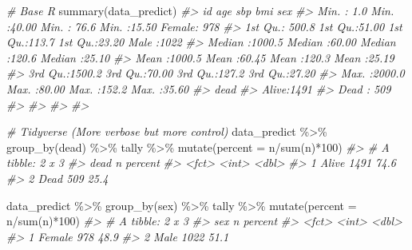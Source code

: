 \documentclass[
]{article}
\newenvironment{Shaded}{\begin{snugshade}}{\end{snugshade}}
\newcommand{\AttributeTok}[1]{\textcolor[rgb]{0.77,0.63,0.00}{#1}}
\newcommand{\CommentTok}[1]{\textcolor[rgb]{0.56,0.35,0.01}{\textit{#1}}}
\newcommand{\DecValTok}[1]{\textcolor[rgb]{0.00,0.00,0.81}{#1}}
\newcommand{\FunctionTok}[1]{\textcolor[rgb]{0.00,0.00,0.00}{#1}}
\newcommand{\NormalTok}[1]{#1}
\newcommand{\SpecialCharTok}[1]{\textcolor[rgb]{0.00,0.00,0.00}{#1}}
\begin{document}
\begin{Shaded}
\begin{Highlighting}[]
\CommentTok{\# Base R}
\FunctionTok{summary}\NormalTok{(data\_predict)}
\CommentTok{\#\textgreater{}        id              age             sbp             bmi            sex      }
\CommentTok{\#\textgreater{}  Min.   :   1.0   Min.   :40.00   Min.   : 76.6   Min.   :15.50   Female: 978  }
\CommentTok{\#\textgreater{}  1st Qu.: 500.8   1st Qu.:51.00   1st Qu.:113.7   1st Qu.:23.20   Male  :1022  }
\CommentTok{\#\textgreater{}  Median :1000.5   Median :60.00   Median :120.6   Median :25.10                }
\CommentTok{\#\textgreater{}  Mean   :1000.5   Mean   :60.45   Mean   :120.3   Mean   :25.19                }
\CommentTok{\#\textgreater{}  3rd Qu.:1500.2   3rd Qu.:70.00   3rd Qu.:127.2   3rd Qu.:27.20                }
\CommentTok{\#\textgreater{}  Max.   :2000.0   Max.   :80.00   Max.   :152.2   Max.   :35.60                }
\CommentTok{\#\textgreater{}     dead     }
\CommentTok{\#\textgreater{}  Alive:1491  }
\CommentTok{\#\textgreater{}  Dead : 509  }
\CommentTok{\#\textgreater{}              }
\CommentTok{\#\textgreater{}              }
\CommentTok{\#\textgreater{}              }
\CommentTok{\#\textgreater{} }

\CommentTok{\# Tidyverse (More verbose but more control)}
\NormalTok{data\_predict }\SpecialCharTok{\%\textgreater{}\%} 
  \FunctionTok{group\_by}\NormalTok{(dead) }\SpecialCharTok{\%\textgreater{}\%} 
\NormalTok{  tally }\SpecialCharTok{\%\textgreater{}\%} 
  \FunctionTok{mutate}\NormalTok{(}\AttributeTok{percent =}\NormalTok{ n}\SpecialCharTok{/}\FunctionTok{sum}\NormalTok{(n)}\SpecialCharTok{*}\DecValTok{100}\NormalTok{)}
\CommentTok{\#\textgreater{} \# A tibble: 2 x 3}
\CommentTok{\#\textgreater{}   dead      n percent}
\CommentTok{\#\textgreater{}   \textless{}fct\textgreater{} \textless{}int\textgreater{}   \textless{}dbl\textgreater{}}
\CommentTok{\#\textgreater{} 1 Alive  1491    74.6}
\CommentTok{\#\textgreater{} 2 Dead    509    25.4}

\NormalTok{data\_predict }\SpecialCharTok{\%\textgreater{}\%} 
  \FunctionTok{group\_by}\NormalTok{(sex) }\SpecialCharTok{\%\textgreater{}\%} 
\NormalTok{  tally }\SpecialCharTok{\%\textgreater{}\%} 
  \FunctionTok{mutate}\NormalTok{(}\AttributeTok{percent =}\NormalTok{ n}\SpecialCharTok{/}\FunctionTok{sum}\NormalTok{(n)}\SpecialCharTok{*}\DecValTok{100}\NormalTok{)}
\CommentTok{\#\textgreater{} \# A tibble: 2 x 3}
\CommentTok{\#\textgreater{}   sex        n percent}
\CommentTok{\#\textgreater{}   \textless{}fct\textgreater{}  \textless{}int\textgreater{}   \textless{}dbl\textgreater{}}
\CommentTok{\#\textgreater{} 1 Female   978    48.9}
\CommentTok{\#\textgreater{} 2 Male    1022    51.1}


\end{Highlighting}
\end{Shaded}
\end{document}
